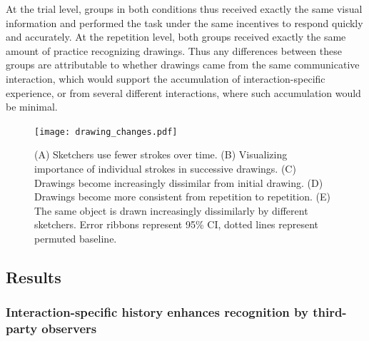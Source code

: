 At the trial level, groups in both conditions thus received exactly the same visual information and performed the task under the same incentives to respond quickly and accurately.
At the repetition level, both groups received exactly the same amount of practice recognizing drawings.
Thus any differences between these groups are attributable to whether drawings came from the same communicative interaction, which would support the accumulation of interaction-specific experience, or from several different interactions, where such accumulation would be minimal.

\begin{figure}
\texttt{[image: drawing\_changes.pdf]}
\centering
\caption{(A) Sketchers use fewer strokes over time. (B) Visualizing importance of individual strokes in successive drawings. (C) Drawings become increasingly dissimilar from initial drawing. (D) Drawings become more consistent from repetition to repetition. %
(E) The same object is drawn increasingly dissimilarly by different sketchers. %
Error ribbons represent 95\% CI, dotted lines represent permuted baseline.}
\label{within-across}
\end{figure}


\subsection{Results}

\subsubsection{Interaction-specific history enhances recognition by third-party observers}



